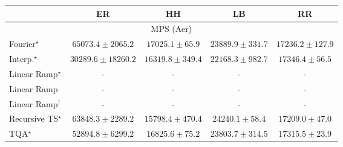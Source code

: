 \begin{tabular}{l|cccc|}
\toprule
            & ER & HH & LB & RR \\
\midrule
\multicolumn{5}{c}{\rule{0pt}{8pt}MPS (Aer)} \\
\midrule
Fourier$^\star$ & {\cellcolor[HTML]{740B70}} \color[HTML]{F1F1F1} $65073.4\pm 2065.2$ & {\cellcolor[HTML]{A9C4DE}} \color[HTML]{000000} $17025.1\pm 65.9$ & {\cellcolor[HTML]{98B0D3}} \color[HTML]{000000} $23889.9\pm 331.7$ & {\cellcolor[HTML]{A8C3DE}} \color[HTML]{000000} $17236.2\pm 127.9$ \\
Interp.$^\star$ & {\cellcolor[HTML]{8D98C7}} \color[HTML]{F1F1F1} $30289.6\pm 18260.2$ & {\cellcolor[HTML]{ABC5DF}} \color[HTML]{000000} $16319.8\pm 349.4$ & {\cellcolor[HTML]{9BB6D7}} \color[HTML]{000000} $22168.3\pm 982.7$ & {\cellcolor[HTML]{A8C3DE}} \color[HTML]{000000} $17346.4\pm 56.5$ \\
Linear Ramp$^\star$ & {\cellcolor[HTML]{000000}} \color[HTML]{F1F1F1} {\cellcolor{white}} \color{black} - & {\cellcolor[HTML]{000000}} \color[HTML]{F1F1F1} {\cellcolor{white}} \color{black} - & {\cellcolor[HTML]{000000}} \color[HTML]{F1F1F1} {\cellcolor{white}} \color{black} - & {\cellcolor[HTML]{000000}} \color[HTML]{F1F1F1} {\cellcolor{white}} \color{black} - \\
Linear Ramp & {\cellcolor[HTML]{000000}} \color[HTML]{F1F1F1} {\cellcolor{white}} \color{black} - & {\cellcolor[HTML]{000000}} \color[HTML]{F1F1F1} {\cellcolor{white}} \color{black} - & {\cellcolor[HTML]{000000}} \color[HTML]{F1F1F1} {\cellcolor{white}} \color{black} - & {\cellcolor[HTML]{000000}} \color[HTML]{F1F1F1} {\cellcolor{white}} \color{black} - \\
Linear Ramp$^\dagger$ & {\cellcolor[HTML]{000000}} \color[HTML]{F1F1F1} {\cellcolor{white}} \color{black} - & {\cellcolor[HTML]{000000}} \color[HTML]{F1F1F1} {\cellcolor{white}} \color{black} - & {\cellcolor[HTML]{000000}} \color[HTML]{F1F1F1} {\cellcolor{white}} \color{black} - & {\cellcolor[HTML]{000000}} \color[HTML]{F1F1F1} {\cellcolor{white}} \color{black} - \\
Recursive TS$^\star$ & {\cellcolor[HTML]{790D75}} \color[HTML]{F1F1F1} $63848.3\pm 2289.2$ & {\cellcolor[HTML]{ADC7E0}} \color[HTML]{000000} $15798.4\pm 470.4$ & {\cellcolor[HTML]{98AED3}} \color[HTML]{000000} $24240.1\pm 58.4$ & {\cellcolor[HTML]{A8C3DE}} \color[HTML]{000000} $17209.0\pm 47.0$ \\
TQA$^\star$ & {\cellcolor[HTML]{873D9A}} \color[HTML]{F1F1F1} $52894.8\pm 6299.2$ & {\cellcolor[HTML]{A9C4DE}} \color[HTML]{000000} $16825.6\pm 75.2$ & {\cellcolor[HTML]{98B0D3}} \color[HTML]{000000} $23803.7\pm 314.5$ & {\cellcolor[HTML]{A8C3DE}} \color[HTML]{000000} $17315.5\pm 23.9$ \\

\end{tabular}
